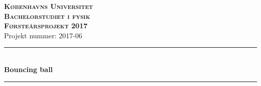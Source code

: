 \documentclass[12pt,oneside,a4paper]{article}
\begin{document}

\begin{center}
{\textsc {\LARGE \bf{Københavns Universitet \\[0.3cm]  Bachelorstudiet i fysik}}}\\[1.5cm]
{\textsc {\Large \bf Førsteårsprojekt 2017}}\\[0.8cm]
{\Large Projekt nummer: 2017-06}\\[1cm]

\rule{15cm}{0.01cm}\\[1cm]
{\LARGE\bf  Bouncing ball}\\ [0.5cm]
\rule{15cm}{0.01cm}\\[1cm]
\end{center}
\end{document}
